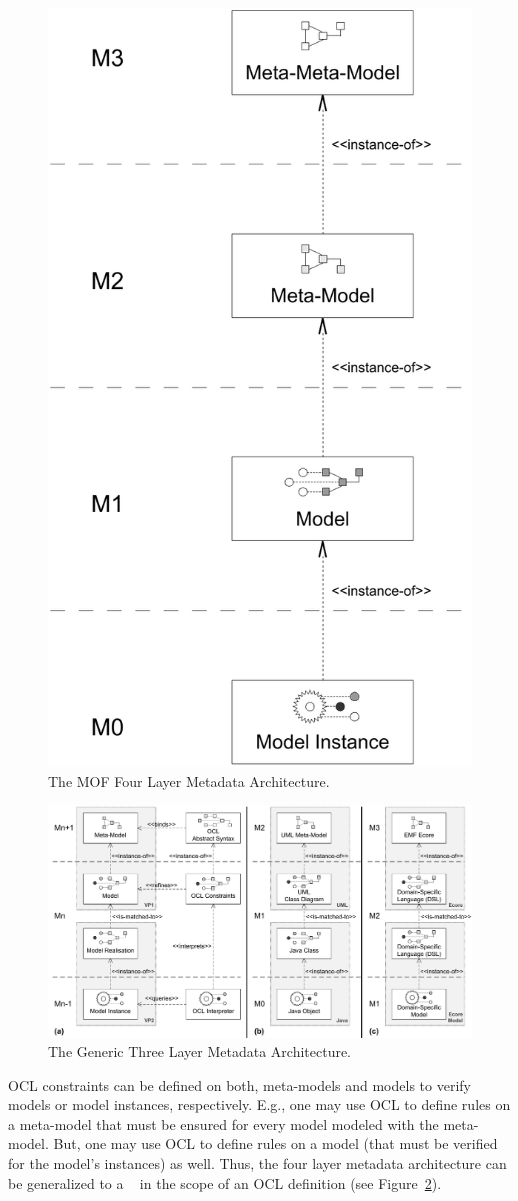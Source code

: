 \begin{figure}[!t]
	\centering
	\includegraphics[width=.4\linewidth]{figures/architecture/mofLayers}
	\caption{The MOF Four Layer Metadata Architecture.}
	\label{pic:architecture:mofLayers}
\end{figure}

\begin{figure}
	\centering
	\includegraphics[width=1.0\linewidth]{figures/architecture/genericLayers}
	\caption{The Generic Three Layer Metadata Architecture.}
	\label{pic:architecture:genericLayers}
\end{figure}

\acs{OCL} constraints can be defined on both, meta-models and models to verify 
models or model instances, respectively. E.g., one may use \acs{OCL} to define 
rules on a meta-model that must be ensured for every model modeled with the 
meta-model. But, one may use \acs{OCL} to define rules on a model (that must be
verified for the model's instances) as well. Thus, the four layer metadata 
architecture can be generalized to a ~\cite{demuth:RGWS09} in the scope of an \acs{OCL} definition (see 
Figure~\ref{pic:architecture:genericLayers}). 

